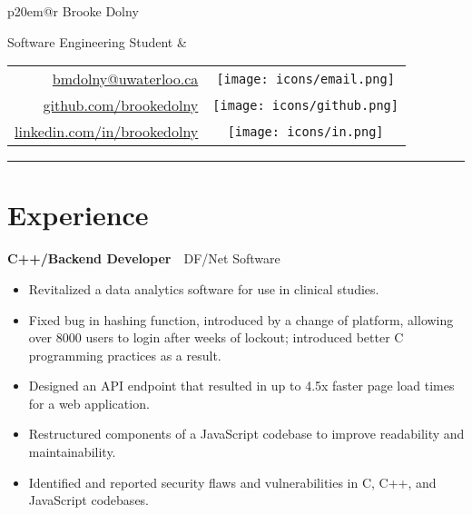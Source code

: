 \documentclass[oneside, 12pt]{memoir}
\newcommand{\TitleFont}[1]{\textnormal{\fontsize{40pt}{0}\selectfont #1}}
\newcommand{\entryGeneral}[4]{
  \begin{adjustwidth}{0.3em}{0em}%
  \textbf{#1}~\cdot~#2\sourceatright{\Date \small #3}%
  \begin{adjustwidth}{0.5em}{2.0em}
    \begin{flushleft}
      {\Merriweather \small #4}%
    \end{flushleft}
  \end{adjustwidth}
  \end{adjustwidth}
  \hfill
}
\newcommand{\github}{\texttt{[image: icons/github.png]}}
\newcommand{\linkedin}{\texttt{[image: icons/in.png]}}
\newcommand{\email}{\texttt{[image: icons/email.png]}}
\newcommand{\phone}{\texttt{[image: icons/phone.png]}}
\begin{document}
\color{textcolor}

\begin{tabular*}{\textwidth}{p{20em}@{\extracolsep{\fill}}r}%
  \TitleFont{\color{titlecolor} Brooke Dolny}

  {\textnormal{ Software Engineering Student}}
  &
  \begin{tabular}{rc}
    \url{bmdolny@uwaterloo.ca} & \email\\
    \url{github.com/brookedolny} & \github\\
    \url{linkedin.com/in/brookedolny} & \linkedin
    \vspace{-0.08em}
    \end{tabular}%
\end{tabular*}
{\color{titlecolor} \rule{\textwidth}{0.1em}}
%
\section*{Experience}

\entryGeneral{C++/Backend Developer}{DF/Net Software}{May 2018---Aug 2018}{
  \begin{itemize}
    \itemsep 0.25em
    \item{
      Revitalized a data analytics software for use in clinical studies.
    }
    \item{
      Fixed bug in hashing function, introduced by a change of platform,
      allowing over 8000 users to login after weeks of lockout; introduced
      better C programming practices as a result.
    }
    \item{
      Designed an API endpoint that resulted in up to 4.5x faster page load
      times for a web application.
    }
    \item{
      Restructured components of a JavaScript codebase to improve readability
      and maintainability.
    }
    \item{
      Identified and reported security flaws and vulnerabilities in C, C++, and
      JavaScript codebases.
    }
  \end{itemize}
}
\end{document}

